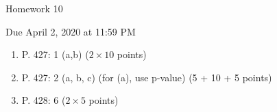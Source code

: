 \documentclass{article}
\begin{document}
\begin{center} \LARGE
Homework 10
\end{center}
\begin{center} \Large
Due April 2, 2020 at 11:59 PM 
\end{center}



\begin{enumerate}
	
	\item P. 427: 1 (a,b) ($2 \times 10$ points)

	
	\item P. 427: 2 (a, b, c) (for (a), use p-value) (5 + 10 + 5 points)
	\item P. 428: 6 ($2 \times 5$ points)


\end{enumerate}

% 
%
\end{document}
